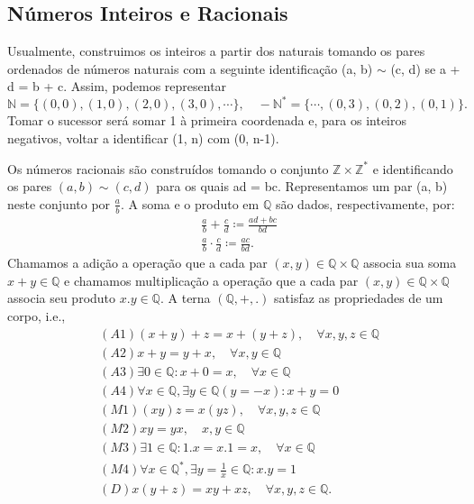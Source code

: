\documentclass{article}
\begin{document}
 \subsection{N\'umeros Inteiros e Racionais}
  Usualmente, construimos os inteiros a partir dos naturais tomando os pares ordenados de n\'umeros naturais
com a seguinte identifica\c c\~ao (a, b) $\mathtt{\sim}$ (c, d) se a + d = b + c. Assim, podemos representar
  $$
  \mathbb{N} = \{(0, 0), (1, 0), (2, 0), (3, 0), \cdots\}, \quad -\mathbb{N}^* = \{\cdots, (0, 3), (0, 2), (0, 1)\}.
  $$
  Tomar o sucessor ser\'a somar 1 \`a primeira coordenada e, para os inteiros negativos, voltar a identificar (1, n) com (0, n-1).

  Os n\'umeros racionais s\~ao constru\'idos tomando o conjunto $\mathbb{Z}\times{\mathbb{Z}^*}$ e identificando os pares $(a, b)\mathtt{\sim}(c, d)$
para os quais ad = bc. Representamos um par (a, b) neste conjunto por $\displaystyle \frac{a}{b}.$ A soma e o produto em $\mathbb{Q}$
s\~ao dados, respectivamente, por: 
 \begin{align*}
   &\frac{a}{b} + \frac{c}{d} \coloneqq \frac{ad + bc}{bd} \\
   &\frac{a}{b}\cdot\frac{c}{d} \coloneqq \frac{ac}{bd}.
 \end{align*}
 Chamamos a adi\c c\~ao a opera\c c\~ao que a cada par $(x, y)\in \mathbb{Q}\times{\mathbb{Q}}$ associa sua soma $x+y\in \mathbb{Q}$
e chamamos multiplica\c c\~ao a opera\c c\~ao que a cada par $(x, y)\in \mathbb{Q}\times \mathbb{Q}$ associa seu produto $x.y\in \mathbb{Q}.$
A terna $(\mathbb{Q}, +, .)$ satisfaz as propriedades de um corpo, i.e., 
 \begin{align*}
   &(A1) (x + y) + z = x + (y + z), \quad\forall x, y, z\in \mathbb{Q}\\
   &(A2) x + y = y + x, \quad\forall x, y\in \mathbb{Q}\\
   &(A3) \exists 0\in \mathbb{Q}: x + 0 = x, \quad\forall x\in \mathbb{Q}\\
   &(A4) \forall x\in \mathbb{Q}, \exists y\in \mathbb{Q} (y = -x): x + y = 0\\
   &(M1) (xy)z = x(yz), \quad\forall x, y, z\in \mathbb{Q}\\
   &(M2) xy = yx, \quad x, y\in \mathbb{Q}\\
   &(M3) \exists 1\in \mathbb{Q}: 1.x = x.1 = x, \quad\forall x\in \mathbb{Q}\\
   &(M4) \forall x\in \mathbb{Q}^*, \exists y = \frac{1}{x}\in \mathbb{Q}: x.y = 1\\
   &(D) x(y+z) = xy + xz,\quad\forall x, y, z\in \mathbb{Q}.
 \end{align*}
\end{document}
